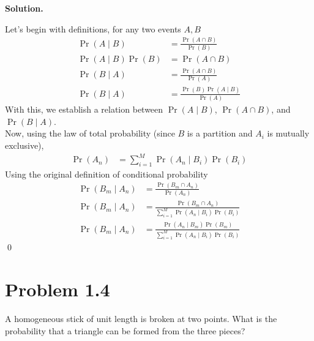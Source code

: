 \documentclass[11pt]{article}
\newenvironment{solution}{\par\noindent\textbf{Solution.}\ }{\par\vspace{6pt}}
\begin{document}
    \begin{solution}

        Let's begin with definitions, for any two events $A, B$
        \begin{align}
            \Pr(A \mid B) &= \frac{\Pr(A \cap B)}{\Pr(B)} \\
            \Pr(A \mid B)\Pr(B) &= \Pr(A \cap B) \\
            \Pr(B \mid A) &= \frac{\Pr(A \cap B)}{\Pr(A)} \\
            \Pr(B \mid A) &= \frac{\Pr(B)\Pr(A \mid B)}{\Pr(A)}
        \end{align}
        With this, we establish a relation between $\Pr(A \mid B)$, $\Pr(A \cap B)$, and $\Pr(B \mid A)$. \\
        Now, using the law of total probability (since $B$ is a partition and $A_i$ is mutually exclusive),
        \begin{align}
            \Pr(A_n) &= \sum_{i=1}^{M}\Pr(A_n \mid B_i)\Pr(B_i)
        \end{align}
        Using the original definition of conditional probability
        \begin{align}
            \Pr(B_m \mid A_n) &= \frac{\Pr(B_m \cap A_n)}{\Pr(A_n)} \\
            \Pr(B_m \mid A_n) &= \frac{\Pr(B_m \cap A_n)}{\sum_{i=1}^{M}\Pr(A_n \mid B_i)\Pr(B_i)} \\
            \Pr(B_m \mid A_n) &= \frac{\Pr(A_n \mid B_m) \Pr(B_m)}{\sum_{i=1}^{M}\Pr(A_n \mid B_i)\Pr(B_i)}
        \end{align}
        \qed

    \end{solution}

    \newpage
    \section*{Problem 1.4}

    A homogeneous stick of unit length is broken at two points. What is the probability that a triangle can be formed from the three pieces?
\end{document}
